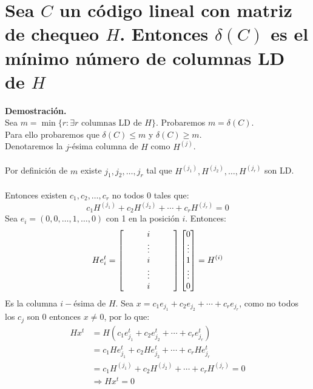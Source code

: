 \documentclass[11pt, a4paper]{article}
\theoremstyle{definition}
\begin{document}
\section{Sea $C$ un código lineal con matriz de chequeo $H$. Entonces $\delta(C)$ es el mínimo número de columnas LD de $H$}
\textbf{Demostración.}\\
Sea
\(m = \min \{r : \exists r \text{ columnas LD de } H\}\).
Probaremos \(m = \delta(C)\).\\
Para ello probaremos que $\delta(C) \leq m$ y $\delta(C) \geq m$.\\
Denotaremos la $j$-ésima columna de $H$ como $H^(j)$.\\ \\
Por definición de $m$ existe $j_1, j_2, \ldots, j_r$ tal que $H^{(j_1)}, H^{(j_2)}, \ldots, H^{(j_r)}$ son LD.\\ \\
Entonces existen $c_1, c_2, \ldots, c_r$ no todos 0 tales que:
\[
c_1H^{(j_1)} + c_2H^{(j_2)} + \cdots + c_rH^{(j_r)} = 0
\]
Sea $e_i = (0, 0, \ldots, 1, \ldots, 0)$ con 1 en la posición $i$. Entonces: 
\[
    He_i^t = \left[
        \begin{array}{c}
        \hspace{8mm} i \hspace{8mm} \\
        \vdots \\
        \hspace{8mm} i \hspace{8mm} \\
        \vdots \\
        \hspace{8mm} i \hspace{8mm}
        \end{array}
        \right]
        \begin{bmatrix}
        0 \\
        \vdots \\
        1 \\
        \vdots \\
        0
        \end{bmatrix} = H^{(i)}
\]
Es la columna $i-$ésima de $H$.
\newpage
Sea $x = c_1e_{j_1} + c_2e_{j_2} + \cdots + c_re_{j_r}$, como no todos los $c_j$ son 0 entonces $x \neq 0$, por lo que:
\begin{align*}
    H x^t &= H(c_1 e_{j_1}^t + c_2 e_{j_2}^t + \cdots + c_r e_{j_r}^t) \\
          &= c_1 H e_{j_1}^t + c_2 H e_{j_2}^t + \cdots + c_r H e_{j_r}^t \\
          &= c_1 H^{(j_1)} + c_2 H^{(j_2)} + \cdots + c_r H^{(j_r)} = 0 \\
          &\Rightarrow H x^t = 0
\end{align*}
\end{document}
